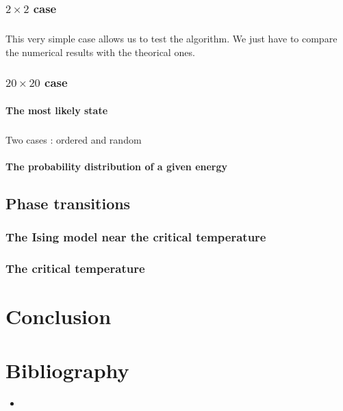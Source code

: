\documentclass[a4paper, twoside, 11pt]{report}
\theoremstyle{theorem}
\theoremstyle{remark}
\theoremstyle{exemple}
\begin{document}
        \subsection{$2\times2$ case}
        
            \paragraph{}This very simple case allows us to test the algorithm. We just have to compare the numerical results with the theorical ones.
            
        \subsection{$20\times20$ case}
        
            \subsubsection{The most likely state}
            
                \paragraph{}Two cases : ordered and random
            
            \subsubsection{The probability distribution of a given energy}
    
    \section{Phase transitions}
    
        \subsection{The Ising model near the critical temperature}
        
        \subsection{The critical temperature}



\chapter*{Conclusion}

    \paragraph{}
    

\chapter*{Bibliography}
    
    \begin{itemize}
        \item
    \end{itemize}
    
\end{document}
